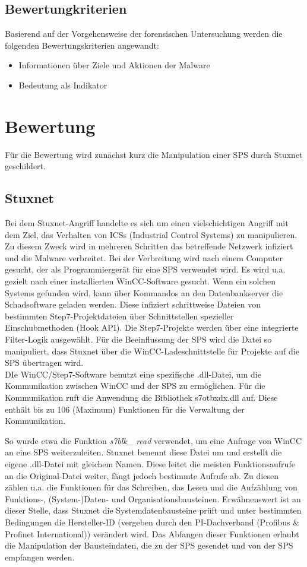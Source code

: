 \subsection{Bewertungkriterien}
Basierend auf der Vorgehensweise der forensischen Untersuchung werden die folgenden Bewertungskriterien angewandt:
\begin{itemize}
\item Informationen über Ziele und Aktionen der Malware
\item Bedeutung als Indikator
\end{itemize}

\section{Bewertung}
Für die Bewertung wird zunächst kurz die Manipulation einer SPS durch Stuxnet geschildert. 

\subsection{Stuxnet}
Bei dem Stuxnet-Angriff handelte es sich um einen vielschichtigen Angriff mit dem Ziel, das Verhalten von ICSs (Industrial Control Systems) zu manipulieren. Zu diesem Zweck wird in mehreren Schritten das betreffende Netzwerk infiziert und die Malware verbreitet. Bei der Verbreitung wird nach einem Computer gesucht, der als Programmiergerät für eine SPS verwendet wird. Es wird u.a. gezielt nach einer installierten WinCC-Software gesucht. Wenn ein solchen Systems gefunden wird, kann über Kommandos an den Datenbankserver die Schadsoftware geladen werden. Diese infiziert schrittweise Dateien von bestimmten Step7-Projektdateien über Schnittstellen spezieller Einschubmethoden (Hook API). Die Step7-Projekte werden über eine integrierte Filter-Logik ausgewählt. Für die Beeinflussung der SPS wird die Datei so manipuliert, dass Stuxnet über die WinCC-Ladeschnittstelle für Projekte auf die SPS übertragen wird. \\

DIe WinCC/Step7-Software benutzt eine spezifische .dll-Datei, um die Kommunikation zwischen WinCC und der SPS zu ermöglichen. Für die Kommunikation ruft die Anwendung die Bibliothek \glqq s7otbxdx.dll\grqq{} auf. Diese enthält bis zu 106 (Maximum) Funktionen für die Verwaltung der Kommunikation. 

So wurde etwa die Funktion \textit{s7blk\_ read} verwendet, um eine Anfrage von WinCC an eine SPS weiterzuleiten. Stuxnet benennt diese Datei um und erstellt die eigene .dll-Datei mit gleichem Namen. Diese leitet die meisten Funktionsaufrufe an die Original-Datei weiter, fängt jedoch bestimmte Aufrufe ab. Zu diesen zählen u.a. die Funktionen für das Schreiben, das Lesen und die Aufzählung von Funktions-, (System-)Daten- und Organisationsbausteinen. 
Erwähnenswert ist an dieser Stelle, dass Stuxnet die Systemdatenbausteine prüft und unter bestimmten Bedingungen die Hersteller-ID (vergeben durch den PI-Dachverband (Profibus \& Profinet International)) verändert wird. Das Abfangen dieser Funktionen erlaubt die Manipulation der Bausteindaten, die zu der SPS gesendet und von der SPS empfangen werden. 

